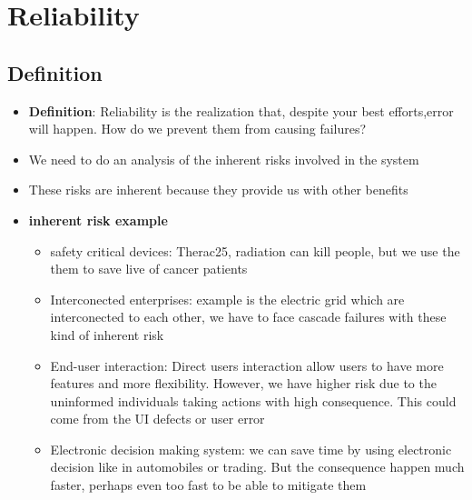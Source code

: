 \documentclass{article}
\begin{document}
 
 
 \section{Reliability}
 \subsection{Definition}
 \begin{itemize}
   \item \textbf{ Definition}: Reliability is the realization that, despite your
   best efforts,error will happen. How do we prevent them from causing failures?
   \item We need to do an analysis of the inherent risks involved in the system
   \item These risks are inherent because they provide us with other benefits
   \item \textbf{inherent risk example}
   \begin{itemize}
     \item safety critical devices: Therac25, radiation can kill people, but we
     use the them to save live of cancer patients
     \item Interconected enterprises: example is the electric grid which are
     interconected to each other, we have to face cascade failures with these
     kind of inherent risk
     \item End-user interaction: Direct users interaction allow users to have
     more features and more flexibility. However, we have higher risk due to the
     uninformed individuals taking actions with high consequence. This could
     come from the UI defects or user error
     \item Electronic decision making system: we can save time by using
     electronic decision like in automobiles or trading. But the consequence
     happen much faster, perhaps even too fast to be able to mitigate them
  \end{itemize}
 \end{itemize}
 
\end{document}
